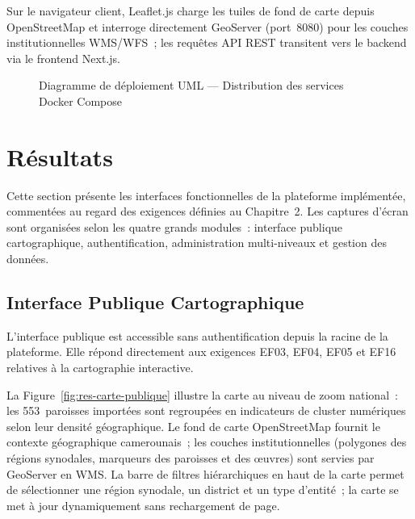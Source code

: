 Sur le navigateur client, Leaflet.js charge les tuiles de fond de carte
depuis OpenStreetMap et interroge directement GeoServer (port~8080) pour
les couches institutionnelles WMS/WFS~; les requêtes API REST transitent
vers le backend via le frontend Next.js.

\begin{figure}[H]
  \centering
  \caption{Diagramme de déploiement UML --- Distribution des services Docker Compose}
  \label{fig:diag-deploiement}
\end{figure}

\section{Résultats}
\label{sec:resultats}

Cette section présente les interfaces fonctionnelles de la plateforme
implémentée, commentées au regard des exigences définies au
Chapitre~2. Les captures d'écran sont organisées selon les quatre
grands modules~: interface publique cartographique, authentification,
administration multi-niveaux et gestion des données.

\subsection{Interface Publique Cartographique}
\label{ssec:res-carte}

L'interface publique est accessible sans authentification depuis la racine
de la plateforme. Elle répond directement aux exigences EF03, EF04, EF05
et EF16 relatives à la cartographie interactive.

La Figure~\ref{fig:res-carte-publique} illustre la carte au niveau de zoom
national~: les 553~paroisses importées sont regroupées en indicateurs de
cluster numériques selon leur densité géographique. Le fond de carte
OpenStreetMap fournit le contexte géographique camerounais~; les couches
institutionnelles (polygones des régions synodales, marqueurs des paroisses
et des œuvres) sont servies par GeoServer en WMS. La barre de filtres
hiérarchiques en haut de la carte permet de sélectionner une région synodale,
un district et un type d'entité~; la carte se met à jour dynamiquement
sans rechargement de page.

